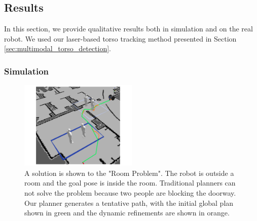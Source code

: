 
\subsection{Results}
\label{sec:navigation_results}

In this section, we provide qualitative results both in simulation and on the real robot. We used our laser-based torso tracking method presented in Section \ref{sec:multimodal_torso_detection}.

\subsubsection{Simulation}
\label{sec:navigation_results_simulation}

\begin{figure}[ht!]
\centering
\includegraphics[width=0.5\textwidth]{pics/room_sol_crop}
\caption{A solution is shown to the "Room Problem". The robot is outside a room and the goal pose is inside the room. Traditional planners can not solve the problem because two people are blocking the doorway. Our planner generates a tentative path, with the initial global plan shown in green and the dynamic refinements are shown in orange.}
\label{fig:room_sol}
\end{figure}

